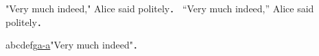 "Very much indeed," Alice said politely． %
``Very much indeed,'' Alice said politely． %

abcdefg\url{a-a}"Very much indeed"．%
